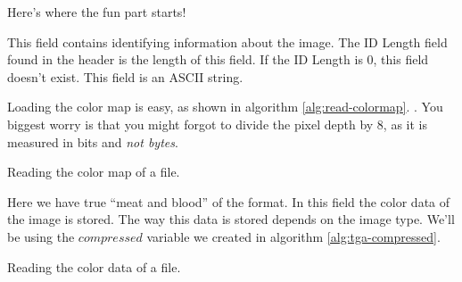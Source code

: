 \begin{refsection}
  Here's where the fun part starts!


  This field contains identifying information about the image. The
  ID Length field found in the header is the length of this field. If
  the ID Length is 0, this field doesn't exist. This field is an ASCII
  string.


  Loading the color map is easy, as shown in algorithm
  \ref{alg:read-colormap}. . You
  biggest worry is that you might forgot to divide the pixel depth by
  8, as it is measured in bits and \textit{not bytes}.

  \begin{algorithm}[H]
    \caption{Reading the color map of a \tga file.}
    \label{alg:read-colormap}
    \begin{algorithmic}[1]
      \EndFor
    \end{algorithmic}
  \end{algorithm}


  Here we have true ``meat and blood'' of the \tga format. In this
  field the color data of the image is stored. The way this data is
  stored depends on the image type. We'll be using the $compressed$
  variable we created in algorithm \ref{alg:tga-compressed}.

  \begin{algorithm}[H]
    \caption{Reading the color data of a \tga file.}
    \label{alg:TGA-read-colordata}
    \newcommand{\process}{\State Process the color $data$ \dots}
    \begin{algorithmic}[1]




            \EndIf



\end{algorithmic}
\end{algorithm}
\end{refsection}

